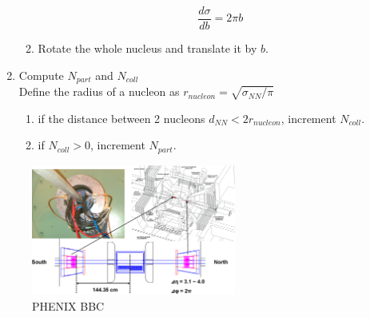 \documentclass[11pt]{article} %
\begin{document}
\begin{enumerate}
\begin{enumerate}
	\begin{equation}
		\frac{d\sigma}{db}=2\pi b
	\end{equation}
	\item Rotate the whole nucleus and translate it by $b$.
	\end{enumerate}
\item Compute $N_{part}$ and $N_{coll}$ \\
	Define the radius of a nucleon as $r_{nucleon}=\sqrt{\sigma_{NN}/\pi}$
	\begin{enumerate}
	\item if the distance between 2 nucleons $d_{NN}<2r_{nucleon}$, increment $N_{coll}$.
	\item if $N_{coll}>0$, increment $N_{part}$.
	\end{enumerate}
\end{enumerate}


\begin{figure}
    \centering
    \includegraphics[width=0.6\textwidth]{plots/PHENIX_BBC.eps}
    \caption{PHENIX BBC}
    \label{fig:phenixbbc}
\end{figure}
\end{document}
